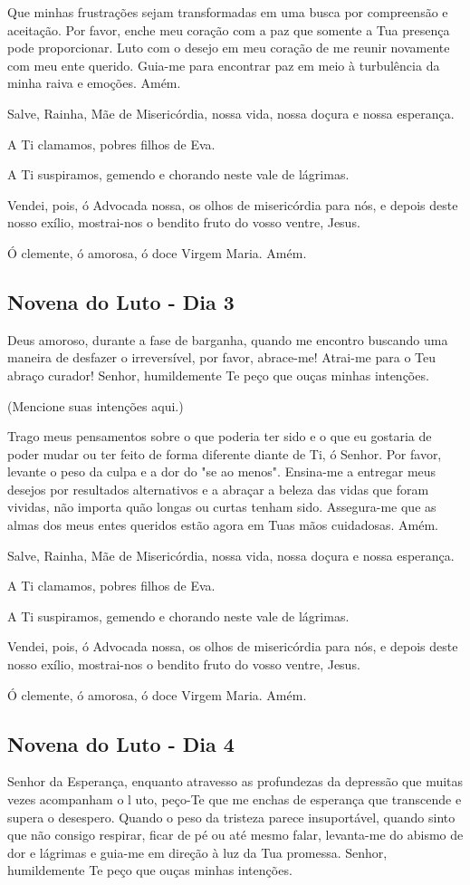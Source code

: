 \documentclass[18pt]{article}
\begin{document}
Que minhas frustrações sejam transformadas em uma busca por compreensão e aceitação. Por favor, enche meu coração com a paz que somente a Tua presença pode proporcionar. Luto com o desejo em meu coração de me reunir novamente com meu ente querido. Guia-me para encontrar paz em meio à turbulência da minha raiva e emoções. Amém.

Salve, Rainha, Mãe de Misericórdia, nossa vida, nossa doçura e nossa esperança.

A Ti clamamos, pobres filhos de Eva.

A Ti suspiramos, gemendo e chorando neste vale de lágrimas.

Vendei, pois, ó Advocada nossa, os olhos de misericórdia para nós, e depois deste nosso exílio, mostrai-nos o bendito fruto do vosso ventre, Jesus.

Ó clemente, ó amorosa, ó doce Virgem Maria. Amém.

\subsection{Novena do Luto - Dia 3}
Deus amoroso, durante a fase de barganha, quando me encontro buscando uma maneira de desfazer o irreversível, por favor, abrace-me! Atrai-me para o Teu abraço curador! Senhor, humildemente Te peço que ouças minhas intenções.

(Mencione suas intenções aqui.)

Trago meus pensamentos sobre o que poderia ter sido e o que eu gostaria de poder mudar ou ter feito de forma diferente diante de Ti, ó Senhor. Por favor, levante o peso da culpa e a dor do "se ao menos". Ensina-me a entregar meus desejos por resultados alternativos e a abraçar a beleza das vidas que foram vividas, não importa quão longas ou curtas tenham sido. Assegura-me que as almas dos meus entes queridos estão agora em Tuas mãos cuidadosas. Amém.

Salve, Rainha, Mãe de Misericórdia, nossa vida, nossa doçura e nossa esperança.

A Ti clamamos, pobres filhos de Eva.

A Ti suspiramos, gemendo e chorando neste vale de lágrimas.

Vendei, pois, ó Advocada nossa, os olhos de misericórdia para nós, e depois deste nosso exílio, mostrai-nos o bendito fruto do vosso ventre, Jesus.

Ó clemente, ó amorosa, ó doce Virgem Maria. Amém.

\subsection{Novena do Luto - Dia 4}
Senhor da Esperança, enquanto atravesso as profundezas da depressão que muitas vezes acompanham o l uto, peço-Te que me enchas de esperança que transcende e supera o desespero. Quando o peso da tristeza parece insuportável, quando sinto que não consigo respirar, ficar de pé ou até mesmo falar, levanta-me do abismo de dor e lágrimas e guia-me em direção à luz da Tua promessa. Senhor, humildemente Te peço que ouças minhas intenções.
\end{document}
